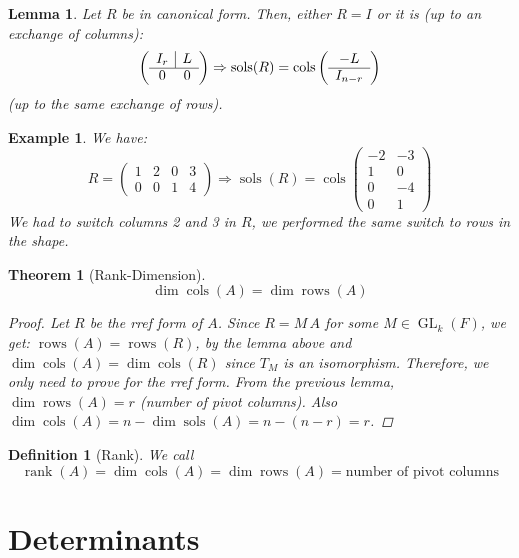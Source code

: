 \documentclass[12pt]{article}
\let\RA\Rightarrow
\DeclareMathOperator{\sols}{sols}
\DeclareMathOperator{\cols}{cols}
\DeclareMathOperator{\rows}{rows}
\DeclareMathOperator{\GL}{GL}
\newtheorem{theorem}{Theorem}[subsection]
\newtheorem{definition}{Definition}[subsection]
\newtheorem{lemma}{Lemma}[subsection]
\newtheorem{example}{Example}[subsection]
\begin{document}
\begin{lemma}
  Let $R$ be in canonical form. Then, either $R=I$ or it is (up to an exchange of columns):
  $$
  \left(
  \begin{array}{cc}
    I_r &\multicolumn{1}{|c}{L}\\ \cline{1-2}
    0 &0 \\
  \end{array}\right)\RA \sols(R)=\cols\left(\begin{array}{c} -L\\ \cline{1-1} I_{n-r} \\ \end{array}\right)$$
    (up to the same exchange of rows).
\end{lemma}

\begin{example}
  We have: $$R=\begin{pmatrix}1&2&0&3\\0&0&1&4\end{pmatrix}\RA \sols(R)=\cols\begin{pmatrix}
    -2&-3\\1&0\\0&-4\\0&1
  \end{pmatrix}$$
  We had to switch columns 2 and 3 in $R$, we performed the same switch to rows in the shape.
\end{example}

\begin{theorem}[Rank-Dimension]
  $$\dim\cols(A)=\dim\rows(A)$$
  \begin{proof}
    Let $R$ be the rref form of $A$. Since $R=M\,A$ for some $M\in\GL_k(F)$, we get: $\rows(A)=\rows(R)$, by the lemma above and $\dim\cols(A)=\dim\cols(R)$ since $T_M$ is an isomorphism. Therefore, we only need to prove for the rref form. From the previous lemma, $\dim\rows(A)=r$ (number of pivot columns). Also $\dim\cols(A)=n-\dim\sols(A)=n-(n-r)=r$.
  \end{proof}
\end{theorem}

\begin{definition}[Rank]
  We call $$\operatorname{rank}(A)=\dim\cols(A)=\dim\rows(A)=\text{number of pivot columns}$$
\end{definition}

\pagebreak

\section{Determinants}
\end{document}
